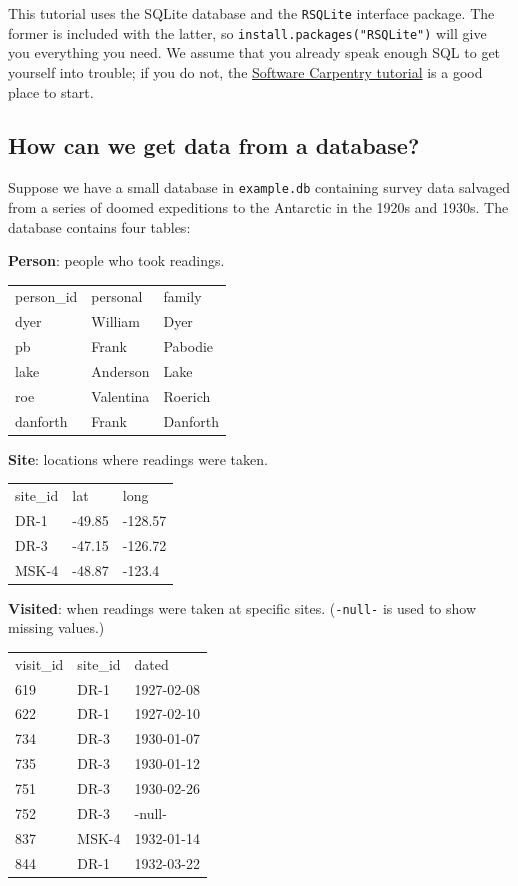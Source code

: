 This tutorial uses the SQLite database and the \texttt{RSQLite} interface package.
The former is included with the latter,
so \texttt{install.packages("RSQLite")} will give you everything you need.
We assume that you already speak enough SQL to get yourself into trouble;
if you do not,
the \href{https://swcarpentry.github.io/sql-novice-survey/}{Software Carpentry tutorial}
is a good place to start.

\subsection*{How can we get data from a database?}

Suppose we have a small database in \texttt{example.db}
containing survey data salvaged from
a series of doomed expeditions to the Antarctic in the 1920s and 1930s.
The database contains four tables:

\noindent
\textbf{Person}: people who took readings.

\begin{longtable}[]{lll}
person\_id & personal & family\\
dyer & William & Dyer\\
pb & Frank & Pabodie\\
lake & Anderson & Lake\\
roe & Valentina & Roerich\\
danforth & Frank & Danforth\\
\end{longtable}

\noindent
\textbf{Site}: locations where readings were taken.

\begin{longtable}[]{lll}
site\_id & lat & long\\
DR-1 & -49.85 & -128.57\\
DR-3 & -47.15 & -126.72\\
MSK-4 & -48.87 & -123.4\\
\end{longtable}

\noindent
\textbf{Visited}: when readings were taken at specific sites.
(\texttt{-null-} is used to show missing values.)

\begin{longtable}[]{lll}
visit\_id & site\_id & dated\\
619 & DR-1 & 1927-02-08\\
622 & DR-1 & 1927-02-10\\
734 & DR-3 & 1930-01-07\\
735 & DR-3 & 1930-01-12\\
751 & DR-3 & 1930-02-26\\
752 & DR-3 & -null-\\
837 & MSK-4 & 1932-01-14\\
844 & DR-1 & 1932-03-22\\
\end{longtable}

